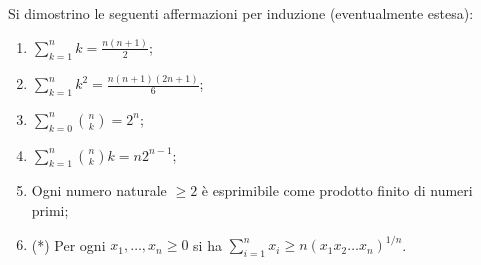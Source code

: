 \begin{es}
  Si dimostrino le seguenti affermazioni per induzione (eventualmente estesa):
  \begin{enumerate}
  \item $ \sum_{k = 1}^{n} k = \frac{n(n + 1)}{2} $;
  \item $ \sum_{k = 1}^{n} k^2 = \frac{n(n + 1)(2n + 1)}{6} $;
  \item $ \sum_{k = 0}^{n} \binom{n}{k} = 2^n $;
  \item $ \sum_{k = 1}^{n} \binom{n}{k} k = n 2^{n-1} $;
  \item Ogni numero naturale $ \geq 2 $ è esprimibile come prodotto finito di numeri primi;
  \item (*) Per ogni $ x_1, \dots, x_n \geq 0 $ si ha $ \sum_{i = 1}^{n} x_i \geq n(x_1 x_2 \dots x_n)^{1/n} $.
  \end{enumerate}
\end{es}

